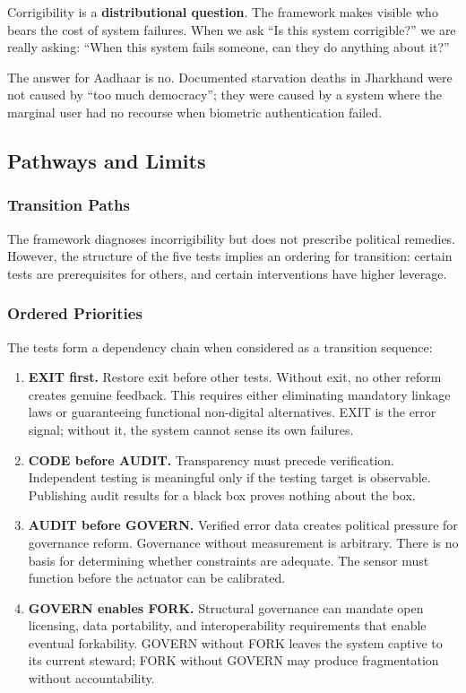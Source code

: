 \documentclass{article}
\begin{document}
Corrigibility is a \textbf{distributional question}. The framework makes visible who bears the cost of system failures. When we ask ``Is this system corrigible?'' we are really asking: ``When this system fails someone, can they do anything about it?''

The answer for Aadhaar is no. Documented starvation deaths in Jharkhand were not caused by ``too much democracy''; they were caused by a system where the marginal user had no recourse when biometric authentication failed.

\subsection{Pathways and Limits}
\label{subsec:pathways}

\subsubsection{Transition Paths}
\label{subsec:transition}

The framework diagnoses incorrigibility but does not prescribe political remedies. However, the structure of the five tests implies an ordering for transition: certain tests are prerequisites for others, and certain interventions have higher leverage.

\subsubsection{Ordered Priorities}

The tests form a dependency chain when considered as a transition sequence:

\begin{enumerate}
    \item \textbf{EXIT first.} Restore exit before other tests. Without exit, no other reform creates genuine feedback. This requires either eliminating mandatory linkage laws or guaranteeing functional non-digital alternatives. EXIT is the error signal; without it, the system cannot sense its own failures.

    \item \textbf{CODE before AUDIT.} Transparency must precede verification. Independent testing is meaningful only if the testing target is observable. Publishing audit results for a black box proves nothing about the box.

    \item \textbf{AUDIT before GOVERN.} Verified error data creates political pressure for governance reform. Governance without measurement is arbitrary. There is no basis for determining whether constraints are adequate. The sensor must function before the actuator can be calibrated.

    \item \textbf{GOVERN enables FORK.} Structural governance can mandate open licensing, data portability, and interoperability requirements that enable eventual forkability. GOVERN without FORK leaves the system captive to its current steward; FORK without GOVERN may produce fragmentation without accountability.
\end{enumerate}
\end{document}
